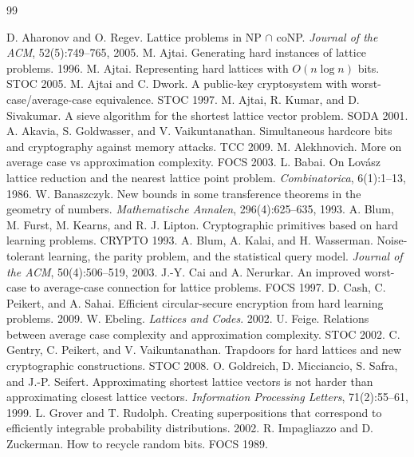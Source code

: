 \documentclass[11pt,a4paper]{article}
\begin{document}
\begin{thebibliography}{99}

 D. Aharonov and O. Regev. Lattice problems in NP $\cap$ coNP. \textit{Journal of the ACM}, 52(5):749--765, 2005.
 M. Ajtai. Generating hard instances of lattice problems. 1996.
 M. Ajtai. Representing hard lattices with $O(n\log n)$ bits. STOC 2005.
 M. Ajtai and C. Dwork. A public-key cryptosystem with worst-case/average-case equivalence. STOC 1997.
 M. Ajtai, R. Kumar, and D. Sivakumar. A sieve algorithm for the shortest lattice vector problem. SODA 2001.
 A. Akavia, S. Goldwasser, and V. Vaikuntanathan. Simultaneous hardcore bits and cryptography against memory attacks. TCC 2009.
 M. Alekhnovich. More on average case vs approximation complexity. FOCS 2003.
 L. Babai. On Lovász lattice reduction and the nearest lattice point problem. \textit{Combinatorica}, 6(1):1--13, 1986.
 W. Banaszczyk. New bounds in some transference theorems in the geometry of numbers. \textit{Mathematische Annalen}, 296(4):625--635, 1993.
 A. Blum, M. Furst, M. Kearns, and R. J. Lipton. Cryptographic primitives based on hard learning problems. CRYPTO 1993.
 A. Blum, A. Kalai, and H. Wasserman. Noise-tolerant learning, the parity problem, and the statistical query model. \textit{Journal of the ACM}, 50(4):506--519, 2003.
 J.-Y. Cai and A. Nerurkar. An improved worst-case to average-case connection for lattice problems. FOCS 1997.
 D. Cash, C. Peikert, and A. Sahai. Efficient circular-secure encryption from hard learning problems. 2009.
 W. Ebeling. \textit{Lattices and Codes}. 2002.
 U. Feige. Relations between average case complexity and approximation complexity. STOC 2002.
 C. Gentry, C. Peikert, and V. Vaikuntanathan. Trapdoors for hard lattices and new cryptographic constructions. STOC 2008.
 O. Goldreich, D. Micciancio, S. Safra, and J.-P. Seifert. Approximating shortest lattice vectors is not harder than approximating closest lattice vectors. \textit{Information Processing Letters}, 71(2):55--61, 1999.
 L. Grover and T. Rudolph. Creating superpositions that correspond to efficiently integrable probability distributions. 2002.
 R. Impagliazzo and D. Zuckerman. How to recycle random bits. FOCS 1989.

\end{thebibliography}
\end{document}
